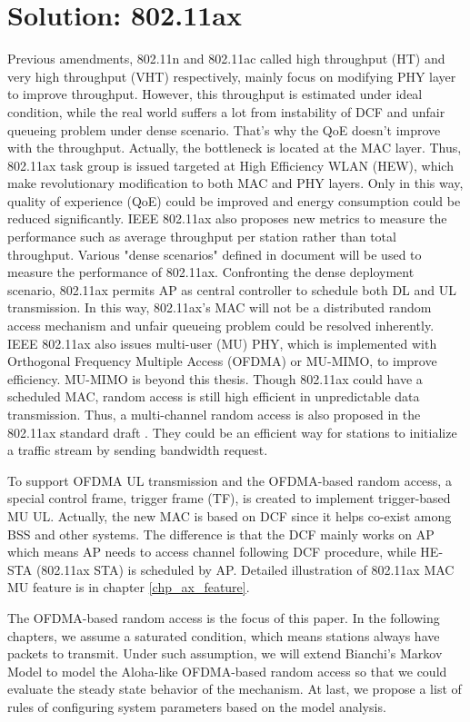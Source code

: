 \section{Solution: 802.11ax}
Previous amendments, 802.11n and 802.11ac called high throughput (HT) and very high throughput (VHT) respectively, mainly focus on modifying PHY layer to improve throughput\cite{perahia2013next}. 
However, this throughput is estimated under ideal condition, while the real world suffers a lot from instability of DCF and unfair queueing problem under dense scenario. 
That's why the QoE doesn't improve with the throughput.  
Actually, the bottleneck is located at the MAC layer.
Thus, 802.11ax task group is issued targeted at High Efficiency WLAN (HEW)\cite{802.11ax_par}, which make revolutionary modification to both MAC and PHY layers.
Only in this way, quality of experience (QoE) could be improved and energy consumption could be reduced significantly.
IEEE 802.11ax also proposes new metrics to measure the performance such as average throughput per station rather than total throughput.
Various "dense scenarios" defined in document \cite{802.11ax_simu} will be used to measure the performance of 802.11ax.
Confronting the dense deployment scenario, 802.11ax permits AP as central controller to schedule both DL and UL transmission. 
In this way, 802.11ax's MAC will not be a distributed random access mechanism and unfair queueing problem could be resolved inherently.
IEEE 802.11ax also issues multi-user (MU) PHY, which is implemented with Orthogonal Frequency Multiple Access (OFDMA) or MU-MIMO, to improve efficiency.
MU-MIMO is beyond this thesis. 
Though 802.11ax could have a scheduled MAC, random access is still high efficient in unpredictable data transmission.
Thus, a multi-channel random access is also proposed in the 802.11ax standard draft \cite{draft_ax}. 
They could be an efficient way for stations to initialize a traffic stream by sending bandwidth request.

To support OFDMA UL transmission and the OFDMA-based random access, a special control frame, trigger frame (TF), is created to implement trigger-based MU UL\cite{draft_ax}. 
Actually, the new MAC is based on DCF since it helps co-exist among BSS and other systems. The difference is that the DCF mainly works on AP which means AP needs to access channel following DCF procedure, while HE-STA (802.11ax STA) is scheduled by AP. 
Detailed illustration of 802.11ax MAC MU feature is in chapter \ref{chp_ax_feature}.

The OFDMA-based random access is the focus of this paper. 
In the following chapters, we assume a saturated condition, which means stations always have packets to transmit.
Under such assumption, we will extend Bianchi's Markov Model to model the Aloha-like OFDMA-based random access so that we could evaluate the steady state behavior of the mechanism.
At last, we propose a list of rules of configuring system parameters based on the model analysis.

